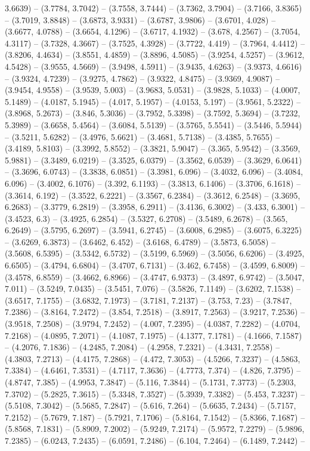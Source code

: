 3.6639) -- (3.7784, 3.7042) -- (3.7558, 3.7444) -- (3.7362, 3.7904) -- (3.7166, 3.8365) -- (3.7019, 3.8848) -- (3.6873, 3.9331) -- (3.6787, 3.9806) -- (3.6701, 4.028) -- (3.6677, 4.0788) -- (3.6654, 4.1296) -- (3.6717, 4.1932) -- (3.678, 4.2567) -- (3.7054, 4.3117) -- (3.7328, 4.3667) -- (3.7525, 4.3928) -- (3.7722, 4.419) -- (3.7964, 4.4412) -- (3.8206, 4.4634) -- (3.8551, 4.4859) -- (3.8896, 4.5085) -- (3.9254, 4.5257) -- (3.9612, 4.5428) -- (3.9555, 4.5669) -- (3.9498, 4.5911) -- (3.9435, 4.6263) -- (3.9373, 4.6616) -- (3.9324, 4.7239) -- (3.9275, 4.7862) -- (3.9322, 4.8475) -- (3.9369, 4.9087) -- (3.9454, 4.9558) -- (3.9539, 5.003) -- (3.9683, 5.0531) -- (3.9828, 5.1033) -- (4.0007, 5.1489) -- (4.0187, 5.1945) -- (4.017, 5.1957) -- (4.0153, 5.197) -- (3.9561, 5.2322) -- (3.8968, 5.2673) -- (3.846, 5.3036) -- (3.7952, 5.3398) -- (3.7592, 5.3694) -- (3.7232, 5.3989) -- (3.6658, 5.4564) -- (3.6084, 5.5139) -- (3.5765, 5.5541) -- (3.5446, 5.5944) -- (3.5211, 5.6282) -- (3.4976, 5.6621) -- (3.4681, 5.7138) -- (3.4385, 5.7655) -- (3.4189, 5.8103) -- (3.3992, 5.8552) -- (3.3821, 5.9047) -- (3.365, 5.9542) -- (3.3569, 5.9881) -- (3.3489, 6.0219) -- (3.3525, 6.0379) -- (3.3562, 6.0539) -- (3.3629, 6.0641) -- (3.3696, 6.0743) -- (3.3838, 6.0851) -- (3.3981, 6.096) -- (3.4032, 6.096) -- (3.4084, 6.096) -- (3.4002, 6.1076) -- (3.392, 6.1193) -- (3.3813, 6.1406) -- (3.3706, 6.1618) -- (3.3614, 6.192) -- (3.3522, 6.2221) -- (3.3567, 6.2384) -- (3.3612, 6.2548) -- (3.3695, 6.2683) -- (3.3779, 6.2819) -- (3.3958, 6.2911) -- (3.4136, 6.3002) -- (3.433, 6.3001) -- (3.4523, 6.3) -- (3.4925, 6.2854) -- (3.5327, 6.2708) -- (3.5489, 6.2678) -- (3.565, 6.2649) -- (3.5795, 6.2697) -- (3.5941, 6.2745) -- (3.6008, 6.2985) -- (3.6075, 6.3225) -- (3.6269, 6.3873) -- (3.6462, 6.452) -- (3.6168, 6.4789) -- (3.5873, 6.5058) -- (3.5608, 6.5395) -- (3.5342, 6.5732) -- (3.5199, 6.5969) -- (3.5056, 6.6206) -- (3.4925, 6.6505) -- (3.4794, 6.6804) -- (3.4707, 6.7131) -- (3.462, 6.7458) -- (3.4599, 6.8009) -- (3.4578, 6.8559) -- (3.4662, 6.8966) -- (3.4747, 6.9373) -- (3.4897, 6.9742) -- (3.5047, 7.011) -- (3.5249, 7.0435) -- (3.5451, 7.076) -- (3.5826, 7.1149) -- (3.6202, 7.1538) -- (3.6517, 7.1755) -- (3.6832, 7.1973) -- (3.7181, 7.2137) -- (3.753, 7.23) -- (3.7847, 7.2386) -- (3.8164, 7.2472) -- (3.854, 7.2518) -- (3.8917, 7.2563) -- (3.9217, 7.2536) -- (3.9518, 7.2508) -- (3.9794, 7.2452) -- (4.007, 7.2395) -- (4.0387, 7.2282) -- (4.0704, 7.2168) -- (4.0895, 7.2071) -- (4.1087, 7.1975) -- (4.1377, 7.1781) -- (4.1666, 7.1587) -- (4.2076, 7.1836) -- (4.2485, 7.2084) -- (4.2958, 7.2321) -- (4.3431, 7.2558) -- (4.3803, 7.2713) -- (4.4175, 7.2868) -- (4.472, 7.3053) -- (4.5266, 7.3237) -- (4.5863, 7.3384) -- (4.6461, 7.3531) -- (4.7117, 7.3636) -- (4.7773, 7.374) -- (4.826, 7.3795) -- (4.8747, 7.385) -- (4.9953, 7.3847) -- (5.116, 7.3844) -- (5.1731, 7.3773) -- (5.2303, 7.3702) -- (5.2825, 7.3615) -- (5.3348, 7.3527) -- (5.3939, 7.3382) -- (5.453, 7.3237) -- (5.5108, 7.3042) -- (5.5685, 7.2847) -- (5.616, 7.264) -- (5.6635, 7.2434) -- (5.7157, 7.2152) -- (5.7679, 7.187) -- (5.7921, 7.1706) -- (5.8164, 7.1542) -- (5.8366, 7.1687) -- (5.8568, 7.1831) -- (5.8909, 7.2002) -- (5.9249, 7.2174) -- (5.9572, 7.2279) -- (5.9896, 7.2385) -- (6.0243, 7.2435) -- (6.0591, 7.2486) -- (6.104, 7.2464) -- (6.1489, 7.2442) -- 